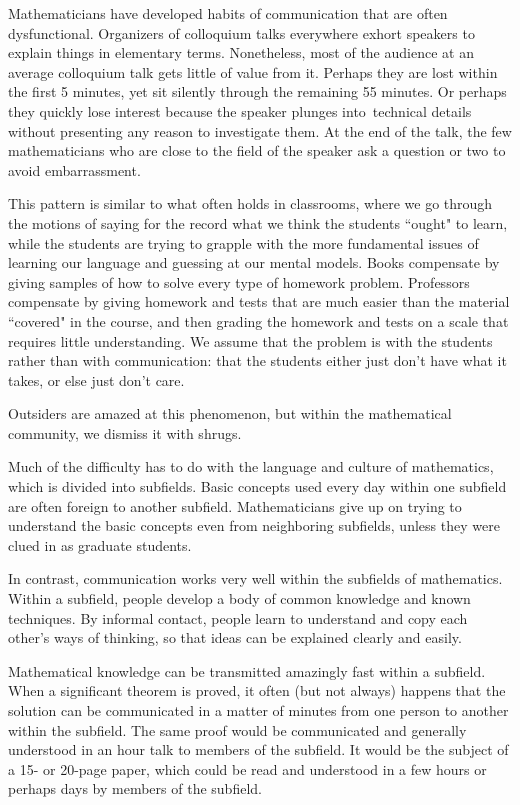 \documentclass[12pt]{amsart}
\begin{document}
Mathematicians have 
developed habits of communication that are often 
dysfunctional. Organizers
of colloquium talks everywhere exhort speakers to explain 
things in 
elementary terms.  Nonetheless, most of the audience at an 
average 
colloquium talk gets little of value from it.  
Perhaps they are lost within the first
5 minutes, yet sit silently through the remaining 55 
minutes. Or perhaps they
quickly lose interest because the speaker plunges
into\ technical details
without presenting any reason to investigate them.   
At the end of the talk, the few mathematicians who are 
close to the field
of the speaker ask a question or two to avoid 
embarrassment.  

This pattern is similar to what often holds in 
classrooms, where we go through the motions of 
saying for the record what we think the students ``ought" 
to learn,
while the students are trying to grapple with the more 
fundamental issues of
learning our language and guessing at our mental models.   
Books compensate
by giving samples of how to solve every type of homework 
problem.
Professors compensate by giving homework and tests that 
are much easier than
the material ``covered" in the course, and then grading 
the homework
and tests on a scale that requires little understanding.
We assume that the problem is with the students rather 
than with
communication: that the students either just don't have 
what it takes,
or else just don't care.

Outsiders are amazed at this phenomenon, but within the
mathematical community, we dismiss it with shrugs.

\smallskip

Much of the difficulty has to do with 
the language and culture of mathematics, which is divided 
into 
subfields.   Basic concepts used every day 
within one subfield are often foreign to another subfield.
Mathematicians give up on trying to understand the basic 
concepts even 
from neighboring subfields, unless they were clued in as 
graduate 
students.

In contrast, communication works very well within the 
subfields
of mathematics. Within a subfield, people develop a body
of common knowledge and known techniques.   By informal 
contact, people 
learn to understand and copy each other's ways of thinking,
so that ideas can be explained clearly and easily.

Mathematical
knowledge can be transmitted amazingly fast within a 
subfield.  When a 
significant theorem is proved, it often (but not always) 
happens that
the solution can be communicated in a matter of minutes 
from one person
to another within the subfield.  The same proof would be 
communicated and
generally understood in an hour talk to members of the 
subfield.   It
would be the subject of a 15- or 20-page paper, which 
could be read and
understood in a few hours or perhaps days by members of 
the subfield.
\end{document}
